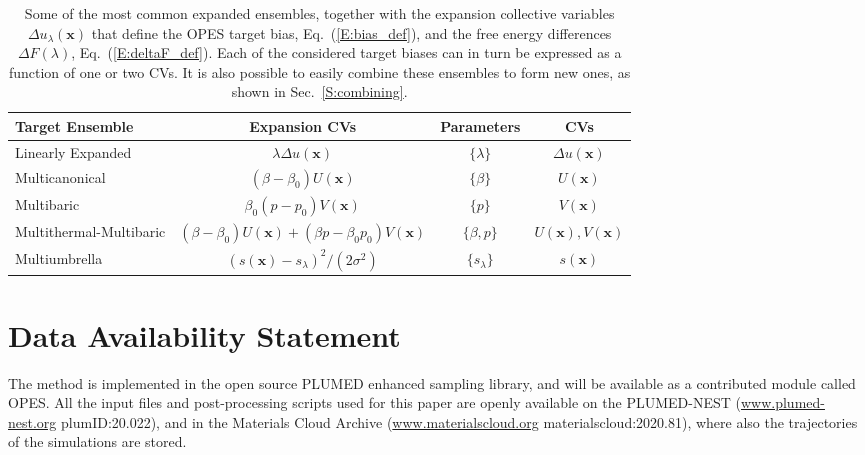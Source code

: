 \documentclass[aps,prx,reprint,superscriptaddress]{revtex4-1} %
\begin{document}
\begin{table}
  \caption{Some of the most common expanded ensembles, together with the expansion collective variables $\Delta u_\lambda(\mathbf{x})$ that define the OPES target bias, Eq.~(\ref{E:bias_def}), and the free energy differences $\Delta F(\lambda)$, Eq.~(\ref{E:deltaF_def}).
  Each of the considered target biases can in turn be expressed as a function of one or two CVs.
  It is also possible to easily combine these ensembles to form new ones, as shown in Sec.~\ref{S:combining}.
  \label{T:ensembles}}
\begin{ruledtabular}
\begin{tabular}{lccc}
     Target Ensemble & Expansion CVs & Parameters & CVs \\
     \hline
     Linearly Expanded & $\lambda \Delta u(\mathbf{x})$ & $\{\lambda\}$ & $\Delta u(\mathbf{x})$ \\
     Multicanonical & $(\beta-\beta_0)U(\mathbf{x})$ & $\{\beta\}$ & $U(\mathbf{x})$ \\
     Multibaric & $\beta_0 (p-p_0) V(\mathbf{x})$ & $\{p\}$ & $V(\mathbf{x})$ \\
     Multithermal-Multibaric & $(\beta-\beta_0)U(\mathbf{x}) +(\beta p-\beta_0 p_0) V(\mathbf{x})$ & $\{\beta, p\}$ & $U(\mathbf{x}), V(\mathbf{x})$ \\
     Multiumbrella & $(s(\mathbf{x})-s_\lambda)^2/(2\sigma^2)$ & $\{s_\lambda\}$ & $s(\mathbf{x})$\\
\end{tabular}
\end{ruledtabular}
\end{table}

\section*{Data Availability Statement}
The method is implemented in the open source PLUMED enhanced sampling library\cite{plumed}, and will be available as a contributed module called OPES.
All the input files and post-processing scripts used for this paper are openly available on the PLUMED-NEST\cite{nest} (\url{www.plumed-nest.org} plumID:20.022), and in the Materials Cloud Archive (\url{www.materialscloud.org} materialscloud:2020.81), where also the trajectories of the simulations are stored.
\end{document}
